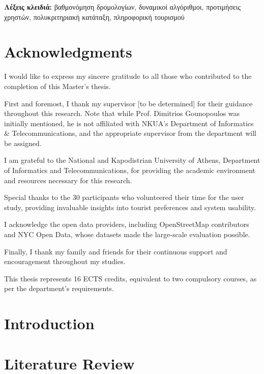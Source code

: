 \documentclass[12pt,a4paper,twoside]{report}
\theoremstyle{definition}
\begin{document}
\textbf{Λέξεις κλειδιά:} βαθμονόμηση δρομολογίων, δυναμικοί αλγόριθμοι, προτιμήσεις χρηστών, πολυκριτηριακή κατάταξη, πληροφορική τουρισμού


\chapter*{Acknowledgments}

I would like to express my sincere gratitude to all those who contributed to the completion of this Master's thesis.

First and foremost, I thank my supervisor [to be determined] for their guidance throughout this research. Note that while Prof. Dimitrios Gounopoulos was initially mentioned, he is not affiliated with NKUA's Department of Informatics \& Telecommunications, and the appropriate supervisor from the department will be assigned.

I am grateful to the National and Kapodistrian University of Athens, Department of Informatics and Telecommunications, for providing the academic environment and resources necessary for this research.

Special thanks to the 30 participants who volunteered their time for the user study, providing invaluable insights into tourist preferences and system usability.

I acknowledge the open data providers, including OpenStreetMap contributors and NYC Open Data, whose datasets made the large-scale evaluation possible.

Finally, I thank my family and friends for their continuous support and encouragement throughout my studies.

This thesis represents 16 ECTS credits, equivalent to two compulsory courses, as per the department's requirements.

\tableofcontents
\listoffigures
\listoftables
\listofalgorithms

\chapter{Introduction}


\chapter{Literature Review}

\end{document}
